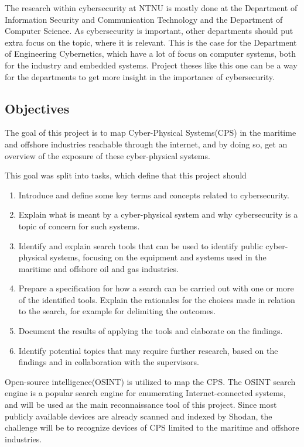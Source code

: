 The research within cybersecurity at NTNU is mostly done at the Department of Information Security and Communication Technology and  the Department of Computer Science. As cybersecurity is important, other departments should put extra focus on the topic, where it is relevant.
This is the case for the Department of Engineering Cybernetics, which have a lot of focus on computer systems, both for the industry and embedded systems. Project theses like this one can be a way for the departments to get more insight in the importance of cybersecurity.

\subsection{Objectives} \label{sec:objectives}
The goal of this project is to map Cyber-Physical Systems(CPS) in the maritime and offshore industries reachable through the internet, and by doing so, get an overview of the exposure of these cyber-physical systems.

This goal was split into tasks, which define that this project should
\begin{enumerate}
    \item Introduce and define some key terms and concepts related to cybersecurity.
    \item Explain what is meant by a cyber-physical system and why cybersecurity is a topic of concern for such systems.
    \item Identify and explain search tools that can be used to identify public cyber-physical systems, focusing on the equipment and systems used in the maritime and offshore oil and gas industries. 
    \item Prepare a specification for how a search can be carried out with one or more of the identified tools. Explain the rationales for the choices made in relation to the search, for example for delimiting the outcomes.
    \item Document the results of applying the tools and elaborate on the findings.
    \item Identify potential topics that may require further research, based on the findings and in collaboration with the supervisors.
\end{enumerate}


Open-source intelligence(OSINT) is utilized to map the CPS. The OSINT search engine \href{https://shodan.io}{\color{blue}{Shodan}}\cite{shodan} is a popular search engine for enumerating Internet-connected systems, and will be used as the main reconnaissance tool of this project. 
Since most publicly available devices are already scanned and indexed by Shodan, the challenge will be to recognize devices of CPS limited to the maritime and offshore industries.


